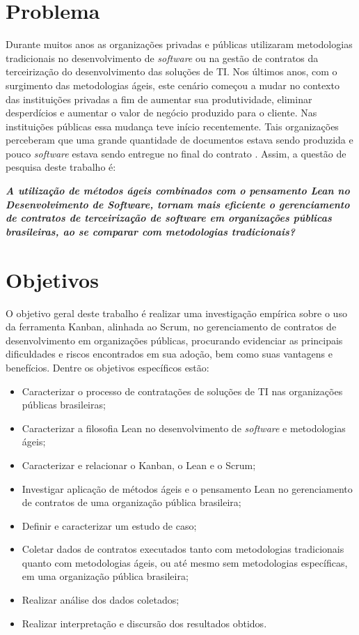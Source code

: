 \section[Problema]{Problema}

Durante muitos anos as organizações privadas e públicas utilizaram metodologias tradicionais no desenvolvimento de \textit{software} ou na gestão de contratos da terceirização do desenvolvimento das soluções de TI. Nos últimos anos, com o surgimento das metodologias ágeis, este cenário começou a mudar no contexto das instituições privadas a fim de aumentar sua produtividade, eliminar desperdícios e aumentar o valor de negócio produzido para o cliente. Nas instituições públicas essa mudança teve início recentemente. Tais organizações perceberam que uma grande quantidade de documentos estava sendo produzida e pouco \textit{software} estava sendo entregue no final do contrato \cite{TCU:2013}. Assim, a questão de pesquisa deste trabalho é:

\textit{\textbf {A utilização de métodos ágeis combinados com o pensamento Lean no Desenvolvimento de \textit{Software}, tornam mais eficiente o gerenciamento de contratos de terceirização de \textit{software} em organizações públicas brasileiras, ao se comparar com metodologias tradicionais?}}

\section[Objetivos]{Objetivos}

O objetivo geral deste trabalho é realizar uma investigação empírica sobre o uso da ferramenta Kanban, alinhada ao Scrum, no gerenciamento de contratos de desenvolvimento em organizações públicas, procurando evidenciar as principais dificuldades e riscos encontrados em sua adoção, bem como suas vantagens e benefícios. Dentre os objetivos específicos estão:

\begin{itemize}
\item Caracterizar o processo de contratações de soluções de TI nas organizações públicas brasileiras;
\item Caracterizar a filosofia Lean no desenvolvimento de \textit{software} e metodologias ágeis;
\item Caracterizar e relacionar o Kanban, o Lean e o Scrum;
\item Investigar aplicação de métodos ágeis e o pensamento Lean no gerenciamento de contratos de uma organização pública brasileira;
\item Definir e caracterizar um estudo de caso;
\item Coletar dados de contratos executados tanto com metodologias tradicionais quanto com metodologias ágeis, ou até mesmo sem metodologias específicas, em uma organização pública brasileira;
\item Realizar análise dos dados coletados;
\item Realizar interpretação e discursão dos resultados obtidos.
\end{itemize}

